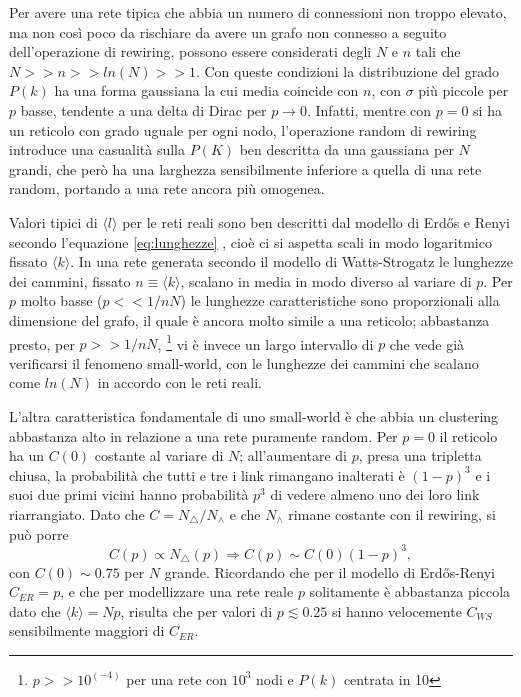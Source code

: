 Per avere una rete tipica che abbia un numero di connessioni non troppo elevato, ma non così poco da rischiare da avere un grafo non connesso a seguito dell'operazione di rewiring, possono essere considerati degli $N$ e $n$ tali che $N>>n>>ln(N)>>1$. Con queste condizioni la distribuzione del grado $P(k)$ ha una forma gaussiana la cui media coincide con $n$, con $\sigma$ più piccole per $p$ basse, tendente a una delta di Dirac per $p \rightarrow 0$. Infatti, mentre con $p=0$ si ha un reticolo con grado uguale per ogni nodo, l'operazione random di rewiring introduce una casualità sulla $P(K)$ ben descritta da una gaussiana per $N$ grandi, che però ha una larghezza sensibilmente inferiore a quella di una rete random, portando a una rete ancora più omogenea.  

Valori tipici di $\langle l \rangle$ per le reti reali sono ben descritti dal modello di Erdős e Renyi secondo l'equazione \ref{eq:lunghezze} \parencite{Barbalbert2002}, cioè ci si aspetta scali in modo logaritmico fissato $\langle k \rangle$. In una rete generata secondo il modello di Watts-Strogatz le lunghezze dei cammini, fissato $n \equiv \langle k \rangle$, scalano in media in modo diverso al variare di $p$. Per $p$ molto basse ($p << 1/nN$) le lunghezze caratteristiche sono proporzionali alla dimensione del grafo, il quale è ancora molto simile a una reticolo; abbastanza presto, per $p >> 1/nN$, \footnote{$p >> 10^(-4)$ per una rete con $10^3$ nodi e $P(k)$ centrata in 10} vi è invece un largo intervallo di $p$ che vede già verificarsi il fenomeno small-world, con le lunghezze dei cammini che scalano come $ln(N)$ in accordo con le reti reali.  

L'altra caratteristica fondamentale di uno small-world è che abbia un clustering abbastanza alto in relazione a una rete puramente random. Per $p = 0$ il reticolo ha un $C(0)$ costante al variare di $N$; all'aumentare di $p$, presa una tripletta chiusa, la probabilità che tutti e tre i link rimangano inalterati è $(1-p)^3$  e i suoi due primi vicini hanno probabilità $p^3$ di vedere almeno uno dei loro link riarrangiato. Dato che $C=N_\triangle/N_\wedge$ e che $N_\wedge$ rimane costante con il rewiring, si può porre 
\[C(p) \propto N_\triangle (p) \Rightarrow C(p) \sim C(0)(1-p)^3, \]
con $C(0) \sim 0.75$ per $N$ grande. Ricordando che per il modello di Erdős-Renyi $C_{ER}=p$, e che per modellizzare una rete reale $p$ solitamente è abbastanza piccola dato che $\langle k \rangle = Np$, risulta che per valori di $p \lesssim 0.25$ si hanno velocemente $C_{WS}$ sensibilmente maggiori di $C_{ER}$.

